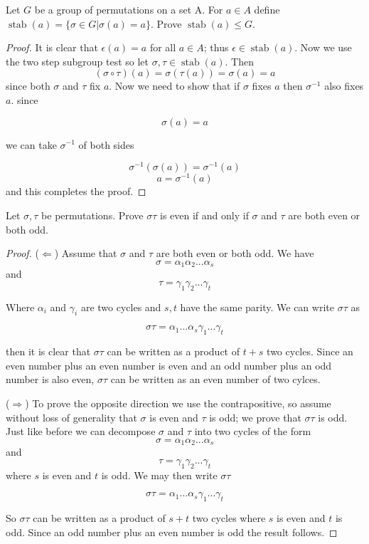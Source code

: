 \documentclass[11pt,largemargins]{homework}
\newcommand{\st}{\operatorname{stab}}
\begin{document}
\maketitle


\question
Let $G$ be a group of permutations on a set A. For $a \in A$ define $\st(a) = \{ \sigma \in G | \sigma(a) = a \} $. Prove 
$\st(a) \leq G$. 

\begin{proof}
    It is clear that $\epsilon(a) = a$ for all $a \in A$; thus $\epsilon \in \st(a)$. Now we use the two step subgroup test so let 
    $\sigma, \tau \in \st(a)$. Then 
    \[(\sigma \circ \tau)(a) = \sigma(\tau(a)) = \sigma(a) = a \] 
    since both $\sigma$ and $\tau$ fix $a$. Now we need to show that if $\sigma$ fixes $a$ then $\sigma^{-1}$ also fixes $a$. 
    since 

    \[ \sigma(a) = a \] 

    we can take $\sigma^{-1}$ of both sides 

    \[ \sigma^{-1}(\sigma(a)) = \sigma^{-1}(a) \] 
    \[ a = \sigma^{-1}(a) \] 
    and this completes the proof. 
    
\end{proof}
\newpage

\question 
Let $\sigma, \tau$ be permutations. Prove $\sigma \tau$ is even if and only if $\sigma$ and $\tau$ are both 
even or both odd. 

\begin{proof}
    ($\Leftarrow$) Assume that $\sigma$ and  $\tau$ are both even or both odd. We have 
    \[ \sigma = \alpha_1 \alpha_2 . . . \alpha_s \] 
    and 
    \[\tau = \gamma_1 \gamma_2 . . . \gamma_t \] 

    Where $\alpha_i$ and $\gamma_i$ are two cycles and $s, t$ have the same parity. We can write $\sigma \tau $ as

    \[ \sigma \tau = \alpha_1 . . . \alpha_s \gamma_1 . . . \gamma_t \]


    then it is clear that $\sigma \tau$ can be written as a product of $t + s$ two cycles. Since an even number plus an even number is 
    even and an odd number plus an odd number is also even, $\sigma \tau$ can be written as an even number of two cylces. 

    ($\Rightarrow$) To prove the opposite direction we use the contrapositive, so assume without loss of generality that $\sigma$ is even 
    and $\tau$ is odd; we prove that $\sigma \tau$ is odd. Just like before we can decompose $\sigma$ and $\tau$ into two cycles of the form 
    \[ \sigma = \alpha_1 \alpha_2 . . . \alpha_s \] 
    and 
    \[\tau = \gamma_1 \gamma_2 . . . \gamma_t \] 
    where $s$ is even and $t$ is odd. We may then write $\sigma \tau$ 

    \[ \sigma \tau = \alpha_1 . . . \alpha_s \gamma_1 . . . \gamma_t \]

    So $\sigma \tau$ can be written as a product of $s + t$ two cycles where $s$ is even and $t$ is odd. Since an odd number 
    plus an even number is odd the result follows. 
    
\end{proof}


\end{document}
